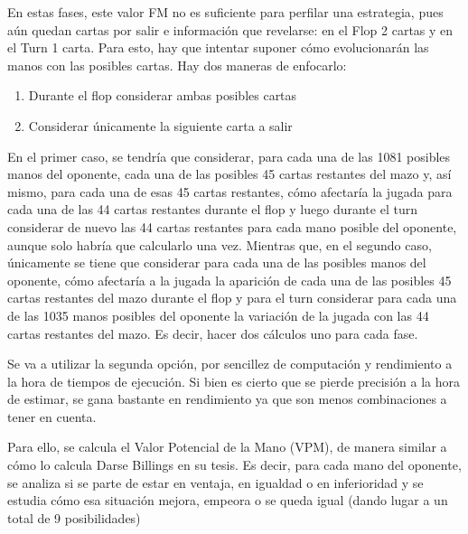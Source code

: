 En estas fases, este valor FM no es suficiente para perfilar una estrategia, pues aún quedan cartas por salir e información que revelarse: en el Flop 2 cartas y en el Turn 1 carta.
Para esto, hay que intentar suponer cómo evolucionarán las manos con las posibles cartas. Hay dos maneras de enfocarlo:

\begin{enumerate}
\item Durante el flop considerar ambas posibles cartas 
\item Considerar únicamente la siguiente carta a salir
\end{enumerate}

En el primer caso, se tendría que considerar, para cada una de las 1081 posibles manos del oponente, cada una de las posibles 45 cartas restantes del mazo y, así mismo, para cada una de esas 45 cartas restantes, cómo afectaría la jugada para cada una de las 44 cartas restantes durante el flop y luego durante el turn considerar de nuevo las 44 cartas restantes para cada mano posible del oponente, aunque solo habría que calcularlo una vez. 
Mientras que, en el segundo caso, únicamente se tiene que considerar para cada una de las posibles manos del oponente, cómo afectaría a la jugada la aparición de cada una de las posibles 45 cartas restantes del mazo durante el flop y para el turn considerar para cada una de las 1035 manos posibles del oponente la variación de la jugada con las 44 cartas restantes del mazo. Es decir, hacer dos cálculos uno para cada fase.


Se va a utilizar la segunda opción, por sencillez de computación y rendimiento a la hora de tiempos de ejecución. Si bien es cierto que se pierde precisión a la hora de estimar, se gana bastante en rendimiento ya que son menos combinaciones a tener en cuenta.

Para ello, se calcula el Valor Potencial de la Mano (VPM), de manera similar a cómo lo calcula Darse Billings en su tesis. Es decir, para cada mano del oponente, se analiza si se parte de estar en ventaja, en igualdad o en inferioridad y se estudia cómo esa situación mejora, empeora o se queda igual (dando lugar a un total de 9 posibilidades)

